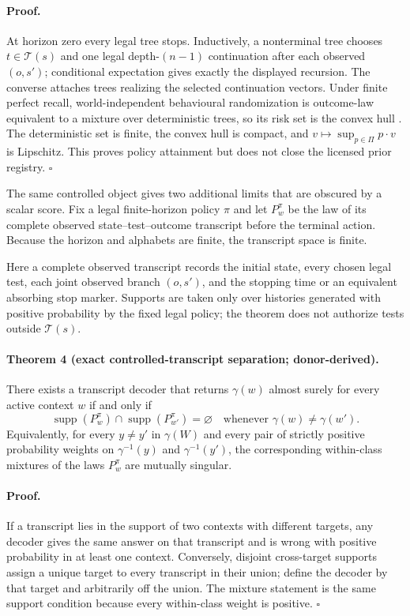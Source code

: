 \paragraph{Proof.}
At horizon zero every legal tree stops.  Inductively, a nonterminal tree chooses
$t\in\mathcal T(s)$ and one legal depth-$(n-1)$ continuation after each observed
$(o,s')$; conditional expectation gives exactly the displayed recursion.  The
converse attaches trees realizing the selected continuation vectors.  Under
finite perfect recall, world-independent behavioural randomization is
outcome-law equivalent to a mixture over deterministic trees, so its risk set
is the convex hull \cite{kuhn1953}. The deterministic set is finite, the convex hull is
compact, and $v\mapsto\sup_{p\in\Pi}p\cdot v$ is Lipschitz.  This proves policy
attainment but does not close the licensed prior registry. \hfill$\square$

The same controlled object gives two additional limits that are obscured by a
scalar score. Fix a legal finite-horizon policy $\pi$ and let $P_w^\pi$ be the
law of its complete observed state--test--outcome transcript before the
terminal action. Because the horizon and alphabets are finite, the transcript
space is finite.

Here a complete observed transcript records the initial state, every chosen
legal test, each joint observed branch $(o,s')$, and the stopping time or an
equivalent absorbing stop marker. Supports are taken only over histories
generated with positive probability by the fixed legal policy; the theorem
does not authorize tests outside $\mathcal T(s)$.

\paragraph{Theorem 4 (exact controlled-transcript separation; donor-derived).}
There exists a transcript decoder that returns $\gamma(w)$ almost surely for
every active context $w$ if and only if
\[
 \operatorname{supp}(P_w^\pi)\cap
 \operatorname{supp}(P_{w'}^\pi)=\varnothing
 \quad\text{whenever }\gamma(w)\ne\gamma(w').
\]
Equivalently, for every $y\ne y'$ in $\gamma(W)$ and every pair of strictly
positive probability weights on $\gamma^{-1}(y)$ and $\gamma^{-1}(y')$, the
corresponding within-class mixtures of the laws $P_w^\pi$ are mutually
singular.

\paragraph{Proof.}
If a transcript lies in the support of two contexts with different targets,
any decoder gives the same answer on that transcript and is wrong with
positive probability in at least one context. Conversely, disjoint cross-target
supports assign a unique target to every transcript in their union; define the
decoder by that target and arbitrarily off the union. The mixture statement is
the same support condition because every within-class weight is positive.
\hfill$\square$

